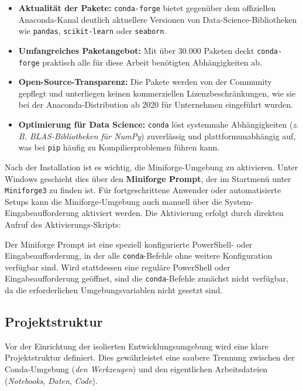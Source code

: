 \begin{itemize}
    \item \textbf{Aktualität der Pakete:} \texttt{conda-forge} bietet gegenüber dem offiziellen Anaconda-Kanal deutlich aktuellere Versionen von Data-Science-Bibliotheken wie \texttt{pandas}, \texttt{scikit-learn} oder \texttt{seaborn}.
    \item \textbf{Umfangreiches Paketangebot:} Mit über 30.000 Paketen deckt \texttt{conda-forge} praktisch alle für diese Arbeit benötigten Abhängigkeiten ab.
    \item \textbf{Open-Source-Transparenz:} Die Pakete werden von der Community gepflegt und unterliegen keinen kommerziellen Lizenzbeschränkungen, wie sie bei der Anaconda-Distribution ab 2020 für Unternehmen eingeführt wurden.
    \item \textbf{Optimierung für Data Science:} \texttt{conda} löst systemnahe Abhängigkeiten (\textit{\acs{z. B.} \acs{BLAS}-Bibliotheken für \acs{NumPy}}) zuverlässig und plattformunabhängig auf, was bei \texttt{\acs{pip}} häufig zu Kompilierproblemen führen kann.
\end{itemize}

Nach der Installation ist es wichtig, die Miniforge-Umgebung zu aktivieren. Unter Windows geschieht dies über den \textbf{Miniforge Prompt}, der im Startmenü unter \texttt{Miniforge3} zu finden ist. Für fortgeschrittene Anwender oder automatisierte Setups kann die Miniforge-Umgebung auch manuell über die System-Eingabeaufforderung aktiviert werden. Die Aktivierung erfolgt durch direkten Aufruf des Aktivierungs-Skripts:



Der Miniforge Prompt ist eine speziell konfigurierte PowerShell- oder Eingabeaufforderung, in der alle \texttt{conda}-Befehle ohne weitere Konfiguration verfügbar sind. Wird stattdessen eine reguläre PowerShell oder Eingabeaufforderung geöffnet, sind die \texttt{conda}-Befehle zunächst nicht verfügbar, da die erforderlichen Umgebungsvariablen nicht gesetzt sind.

\subsection{Projektstruktur}

Vor der Einrichtung der isolierten Entwicklungsumgebung wird eine klare Projektstruktur definiert. Dies gewährleistet eine saubere Trennung zwischen der Conda-Umgebung (\textit{den Werkzeugen}) und den eigentlichen Arbeitsdateien (\textit{Notebooks}, \textit{Daten}, \textit{Code}).


